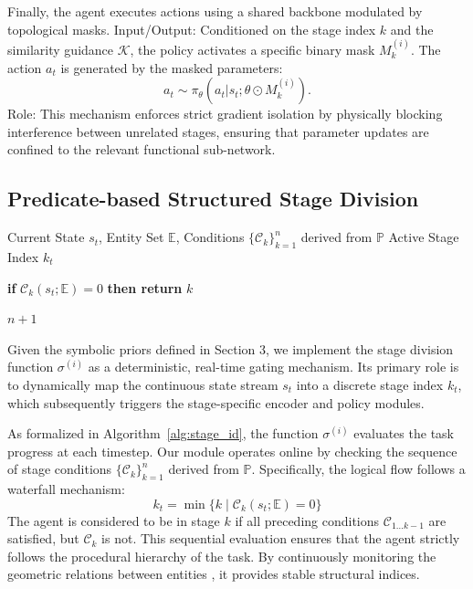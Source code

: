 \documentclass{article}
\begin{document}
Finally, the agent executes actions using a shared backbone modulated by topological masks.
Input/Output: Conditioned on the stage index $k$ and the similarity guidance $\mathcal{K}$, the policy activates a specific binary mask $M_{k}^{(i)}$. The action $a_t$ is generated by the masked parameters:
\begin{equation}
a_t \sim \pi_{\theta}(a_t | s_t; \theta \odot M_{k}^{(i)}).
\label{eq:policy_execution}
\end{equation}
Role: This mechanism enforces strict gradient isolation by physically blocking interference between unrelated stages, ensuring that parameter updates are confined to the relevant functional sub-network.

\subsection{Predicate-based Structured Stage Division}


\renewcommand{\algorithmicrequire}{\textbf{Input:}}
\renewcommand{\algorithmicensure}{\textbf{Output:}}
\begin{algorithm}[t]
\caption{Predicate-based Stage Identification}
\label{alg:stage_id}
\begin{algorithmic}[1]
\REQUIRE Current State $s_t$, Entity Set $\mathbb{E}$, Conditions $\{\mathcal{C}_k\}_{k=1}^n$ derived from $\mathbb{P}$
\ENSURE Active Stage Index $k_t$

    \STATE \textbf{if} $\mathcal{C}_k(s_t; \mathbb{E}) = 0$ \textbf{then return} $k$
\ENDFOR

\RETURN $n + 1$ 
\end{algorithmic}
\end{algorithm}


Given the symbolic priors defined in Section 3, we implement the stage division function $\sigma^{(i)}$ as a deterministic, real-time gating mechanism.
Its primary role is to dynamically map the continuous state stream $s_t$ into a discrete stage index $k_t$, which subsequently triggers the stage-specific encoder and policy modules.

As formalized in Algorithm~\ref{alg:stage_id}, the function $\sigma^{(i)}$ evaluates the task progress at each timestep.
Our module operates online by checking the sequence of stage conditions $\{\mathcal{C}_k\}_{k=1}^n$ derived from $\mathbb{P}$.
Specifically, the logical flow follows a waterfall mechanism:
\begin{equation}
k_t = \min\{ k \mid \mathcal{C}_k(s_t; \mathbb{E}) = 0 \}
\end{equation}
The agent is considered to be in stage $k$ if all preceding conditions $\mathcal{C}_{1 \dots k-1}$ are satisfied, but $\mathcal{C}_k$ is not.
This sequential evaluation ensures that the agent strictly follows the procedural hierarchy of the task.
By continuously monitoring the geometric relations between entities , it provides stable structural indices.
\end{document}
